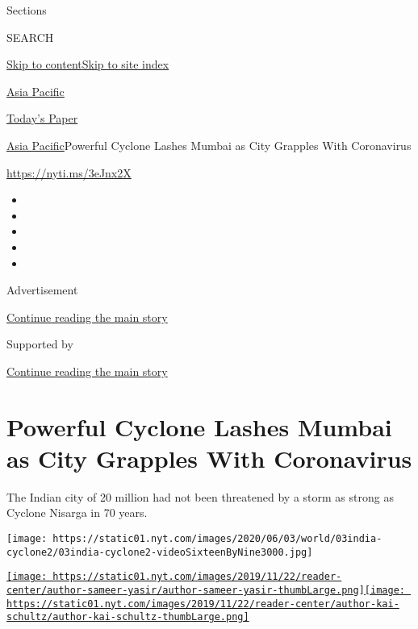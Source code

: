 Sections

SEARCH

\protect\hyperlink{site-content}{Skip to
content}\protect\hyperlink{site-index}{Skip to site index}

\href{https://www.nytimes.com/section/world/asia}{Asia Pacific}

\href{https://myaccount.nytimes.com/auth/login?response_type=cookie\&client_id=vi}{}

\href{https://www.nytimes.com/section/todayspaper}{Today's Paper}

\href{/section/world/asia}{Asia Pacific}\textbar{}Powerful Cyclone
Lashes Mumbai as City Grapples With Coronavirus

\url{https://nyti.ms/3eJnx2X}

\begin{itemize}
\item
\item
\item
\item
\item
\end{itemize}

Advertisement

\protect\hyperlink{after-top}{Continue reading the main story}

Supported by

\protect\hyperlink{after-sponsor}{Continue reading the main story}

\hypertarget{powerful-cyclone-lashes-mumbai-as-city-grapples-with-coronavirus}{%
\section{Powerful Cyclone Lashes Mumbai as City Grapples With
Coronavirus}\label{powerful-cyclone-lashes-mumbai-as-city-grapples-with-coronavirus}}

The Indian city of 20 million had not been threatened by a storm as
strong as Cyclone Nisarga in 70 years.

\texttt{[image: https://static01.nyt.com/images/2020/06/03/world/03india-cyclone2/03india-cyclone2-videoSixteenByNine3000.jpg]}

\href{https://www.nytimes.com/by/sameer-yasir}{\texttt{[image: https://static01.nyt.com/images/2019/11/22/reader-center/author-sameer-yasir/author-sameer-yasir-thumbLarge.png]}}\href{https://www.nytimes.com/by/kai-schultz}{\texttt{[image: https://static01.nyt.com/images/2019/11/22/reader-center/author-kai-schultz/author-kai-schultz-thumbLarge.png]}}

